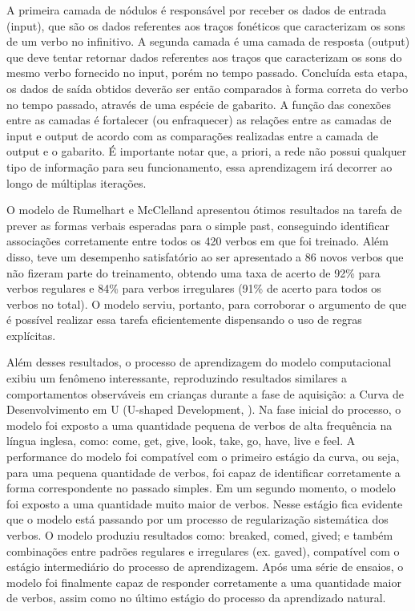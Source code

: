 A primeira camada de nódulos é responsável por receber os dados de entrada (input), que são os dados referentes aos traços fonéticos que caracterizam os sons de um verbo no infinitivo. A segunda camada é uma camada de resposta (output) que deve tentar retornar dados referentes aos traços que caracterizam os sons do mesmo verbo fornecido no input, porém no tempo passado. Concluída esta etapa, os dados de saída obtidos deverão ser então comparados à forma correta do verbo no tempo passado, através de uma espécie de gabarito. A função das conexões entre as camadas é fortalecer (ou enfraquecer) as relações entre as camadas de input e output de acordo com as comparações realizadas entre a camada de output e o gabarito. É importante notar que, a priori, a rede não possui qualquer tipo de informação para seu funcionamento, essa aprendizagem irá decorrer ao longo de múltiplas iterações.

O modelo de Rumelhart e McClelland apresentou ótimos resultados na tarefa de prever as formas verbais esperadas para o simple past, conseguindo identificar associações corretamente entre todos os 420 verbos em que foi treinado. Além disso, teve um desempenho satisfatório ao ser apresentado a 86 novos verbos que não fizeram parte do treinamento, obtendo uma taxa de acerto de 92\% para verbos regulares e 84\% para verbos irregulares (91\% de acerto para todos os verbos no total). O modelo serviu, portanto, para corroborar o argumento de que é possível realizar essa tarefa eficientemente dispensando o uso de regras explícitas. 

Além desses resultados, o processo de aprendizagem do modelo computacional exibiu um fenômeno interessante, reproduzindo resultados similares a comportamentos observáveis em crianças durante a fase de aquisição: a Curva de Desenvolvimento em U (U-shaped Development, \cite{marcus:1992}). Na fase inicial do processo, o modelo foi exposto a uma quantidade pequena de verbos de alta frequência na língua inglesa, como: come, get, give, look, take, go, have, live e feel. A performance do modelo foi compatível com o primeiro estágio da curva, ou seja, para uma pequena quantidade de verbos, foi capaz de identificar corretamente a forma correspondente no passado simples. Em um segundo momento, o modelo foi exposto a uma quantidade muito maior de verbos. Nesse estágio fica evidente que o modelo está passando por um processo de regularização sistemática dos verbos. O modelo produziu resultados como: breaked, comed, gived; e também combinações entre padrões regulares e irregulares (ex. gaved),  compatível com o estágio intermediário do processo de aprendizagem. Após uma série de ensaios, o modelo foi finalmente capaz de responder corretamente a uma quantidade maior de verbos, assim como no último estágio do processo da aprendizado natural. 

